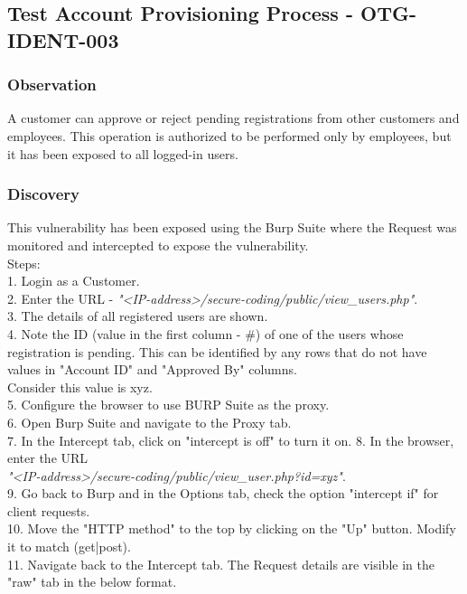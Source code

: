 \subsection{Test Account Provisioning Process - OTG-IDENT-003} \label{OTG-IDENT-003}

\subsubsection{Observation}
A customer can approve or reject pending registrations from other customers and employees. This operation is authorized to be performed only by employees, but it has been exposed to all logged-in users. 

\subsubsection{Discovery}
This vulnerability has been exposed using the Burp Suite where the Request was monitored and intercepted to expose the vulnerability.\\
Steps: \\
1. Login as a Customer. \\
2. Enter the URL -  \textit{"<IP-address>/secure-coding/public/view\_users.php"}. \\
3. The details of all registered users are shown. \\
4. Note the ID (value in the first column - \#) of one of the users whose registration is pending. This can be identified by any rows that do not have values in "Account ID" and "Approved By" columns.\\
Consider this value is xyz. \\
5. Configure the browser to use BURP Suite as the proxy. \\
6. Open Burp Suite and navigate to the Proxy tab. \\
7. In the Intercept tab, click on "intercept is off" to turn it on.
8. In the browser, enter the URL \\
\textit{"<IP-address>/secure-coding/public/view\_user.php?id=xyz"}. \\
9. Go back to Burp and in the Options tab, check the option "intercept if" for client requests. \\
10. Move the "HTTP method" to the top by clicking on the "Up" button. Modify it to match (get|post). \\
11. Navigate back to the Intercept tab. The Request details are visible in the "raw" tab in the below format. \\ 
